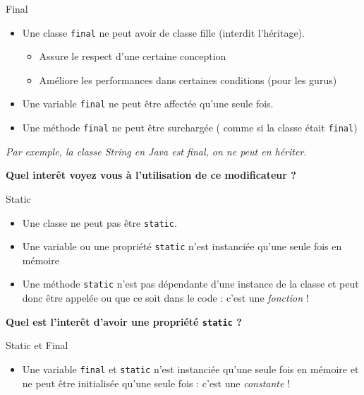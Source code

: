 \documentclass[handout]{beamer}
\begin{document}
\begin{frame}
	\begin{block}{Final}
		\begin{itemize}
			\item Une classe \texttt{final} ne peut avoir de classe fille (interdit l'héritage).
				\begin{itemize}
					\item Assure le respect d'une certaine conception
					\item Améliore les performances dans certaines conditions (pour les gurus)
				\end{itemize}
			\item Une variable \texttt{final} ne peut être affectée qu'une seule fois.
			\item Une méthode \texttt{final} ne peut être surchargée ( comme si la classe était \texttt{final})
		\end{itemize}
	\end{block}
	\textit{Par exemple, la classe String en Java est final, on ne peut en hériter.}
	\begin{center}
		\textbf{Quel interêt voyez vous à l'utilisation de ce modificateur ?}
	\end{center}
\end{frame}

\begin{frame}
	\begin{block}{Static}
		\begin{itemize}
			\item Une classe ne peut pas être \texttt{static}.
			\item Une variable ou une propriété \texttt{static} n'est instanciée qu'une seule fois en mémoire 
			\item Une méthode \texttt{static} n'est pas dépendante d'une instance de la classe et peut donc être appelée ou que ce soit dans le code : c'est une \textit{fonction} !
		\end{itemize}
	\end{block}
	\begin{center}
		\textbf{Quel est l'interêt d'avoir une propriété \texttt{static} ? }
	\end{center}
\end{frame}

\begin{frame}
	\begin{block}{Static et Final}
		\begin{itemize}
			\item Une variable \texttt{final} et \texttt{static} n'est instanciée qu'une seule fois en mémoire et ne peut être initialisée qu'une seule fois : c'est une \textit{constante} !
		\end{itemize}
		
	\end{block}
\end{frame}
\end{document}
